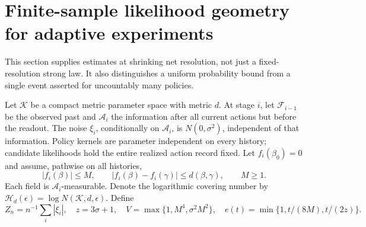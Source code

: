 \section{Finite-sample likelihood geometry for adaptive experiments}
\label{sec:finite-sample-geometry}
This section supplies estimates at shrinking net resolution, not just a
fixed-resolution strong law. It also distinguishes a uniform probability
bound from a single event asserted for uncountably many policies.

Let \(\mathcal K\) be a compact metric parameter space with metric \(d\).
At stage \(i\), let \(\mathcal F_{i-1}\) be the observed past and
\(\mathcal A_i\) the information after all current actions but before the
readout. The noise \(\xi_i\), conditionally on \(\mathcal A_i\), is
\(N(0,\sigma^2)\), independent of that information. Policy kernels are
parameter independent on every history; candidate likelihoods hold the
entire realized action record fixed. Let \(f_i(\beta_0)=0\) and assume,
pathwise on all histories,
\begin{equation}
 |f_i(\beta)|\le M,\qquad
 |f_i(\beta)-f_i(\gamma)|\le d(\beta,\gamma),\qquad M\ge1.
 \label{eq:uniform-field-hypotheses}
\end{equation}
Each field is \(\mathcal A_i\)-measurable. Denote the logarithmic covering
number by \(\mathcal H_d(\epsilon)=\log N(\mathcal K,d,\epsilon)\).
Define
\[
 Z_n=n^{-1}\sum_i|\xi_i|,\quad z=3\sigma+1,\quad
 V=\max\{1,M^4,\sigma^2M^2\},\quad
 e(t)=\min\{1,t/(8M),t/(2z)\}.
\]

